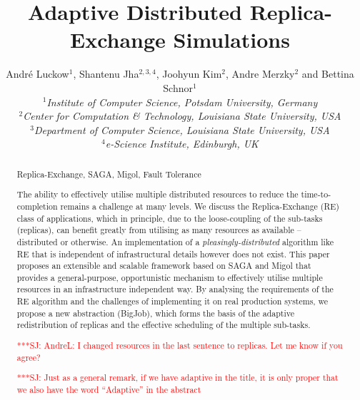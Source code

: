 \documentclass{rspublic}
\title[Adaptive Distributed Replica-Exchange Simulations]{Adaptive Distributed
  Replica-Exchange Simulations}
\author[Luckow, Jha, Kim, Merzky, Schnor]{
  Andr\'e Luckow$^{1}$, Shantenu Jha$^{2,3,4}$, Joohyun Kim$^{2}$, Andre Merzky$^{2}$ and Bettina Schnor$^{1}$\\
  \small{\emph{$^{1}$Institute of Computer Science, Potsdam University, Germany}}\\
  \small{\emph{$^{2}$Center for Computation \& Technology, Louisiana State University, USA}}\\
  \small{\emph{$^{3}$Department of Computer Science, Louisiana State
      University, USA}}\\
  \small{\emph{$^{4}$e-Science Institute, Edinburgh, UK}}\\
}
\newcommand{\jhanote}[1]{ {\textcolor{red} { ***SJ: #1 }}}
\newcommand{\jhanote}[1]{}
\begin{document}
 


\maketitle    

\begin{abstract}{Replica-Exchange, SAGA, Migol, Fault Tolerance}  


  The ability to effectively utilise multiple distributed resources to
  reduce the time-to-completion remains a challenge at many levels.
  We discuss the Replica-Exchange (RE) class of applications, which in
  principle, due to the loose-coupling of the sub-tasks (replicas),
  can benefit greatly from utilising as many resources as available --
  distributed or otherwise.  An implementation of a {\it
    pleasingly-distributed} algorithm like RE that is
  independent of infrastructural details however does not exist.  This
  paper proposes an extensible and scalable framework based on SAGA
  and Migol that provides a general-purpose, opportunistic mechanism
  to effectively utilise multiple resources in an infrastructure
  independent way. By analysing the requirements of the RE algorithm
  and the challenges of implementing it on real production systems, we
  propose a new abstraction (BigJob), which forms the basis of the
  adaptive redistribution of replicas and the effective scheduling of
  the multiple sub-tasks.
  
  \jhanote{AndreL: I changed resources in the last sentence to
    replicas. Let me know if you agree?}

  \jhanote{Just as a general remark, if we have adaptive in the title,
    it is only proper that we also have the word ``Adaptive'' in the
    abstract}



\end{abstract}
\end{document}
